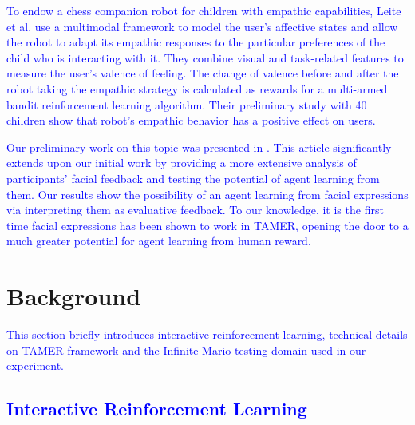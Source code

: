 \textcolor{blue}{To endow a chess companion robot for children with empathic capabilities, Leite et al. \cite{leite2011modelling} use a multimodal framework to model the user's affective states and allow the robot to adapt its empathic responses to the particular preferences of the child who is interacting with it. They combine visual and task-related features to measure the user's valence of feeling. The change of valence before and after the robot taking the empathic strategy is calculated as rewards for a multi-armed bandit reinforcement learning algorithm. Their preliminary study with 40 children show that robot's empathic behavior has a positive effect on users.} %

\textcolor{blue}{Our preliminary work on this topic was presented in \cite{li2015large,li2016towards}. This article significantly extends upon our initial work by providing a more extensive analysis of participants' facial feedback and testing the potential of agent learning from them. Our results show the possibility of an agent learning from facial expressions via interpreting them as %
evaluative feedback. %
To our knowledge, it is the first time facial expressions %
has been shown to work in TAMER, opening the door to a much greater potential for agent learning from human reward.}

\section{Background}
\label{sec:bg}
\textcolor{blue}{This section briefly introduces interactive reinforcement learning, technical details on TAMER framework and the Infinite Mario testing domain used in our experiment.}

\subsection{\textcolor{blue}{Interactive Reinforcement Learning}}
\label{sec:irl}


